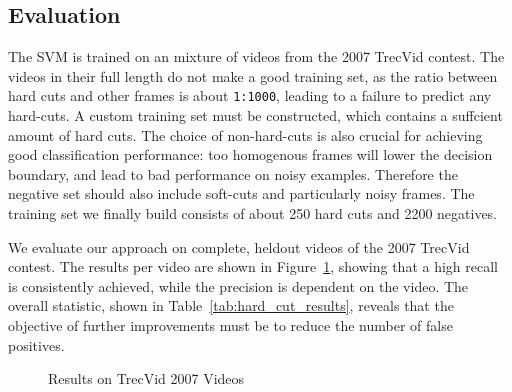 \FloatBarrier
\subsection{Evaluation}
\label{sec:hard_cut_evaluation}




The SVM is trained on an mixture of videos from the 2007 TrecVid contest.
The videos in their full length do not make a good training set, as the ratio between hard cuts and other frames is about \texttt{1:1000}, leading to a failure to predict any hard-cuts.
A custom training set must be constructed, which contains a suffcient amount of hard cuts.
The choice of non-hard-cuts is also crucial for achieving good classification performance: too homogenous frames will lower the decision boundary, and lead to bad performance on noisy examples.
Therefore the negative set should also include soft-cuts and particularly noisy frames.
The training set we finally build consists of about 250 hard cuts and 2200 negatives.


We evaluate our approach on complete, heldout videos of the 2007 TrecVid contest. The results per video are shown in Figure~\ref{fid:scatterplothceval}, showing that a high recall is consistently achieved, while the precision is dependent on the video. The overall statistic, shown in Table~\ref{tab:hard_cut_results},  reveals that the objective of further improvements must be to reduce the number of false positives.

\begin{figure}
\centering
{}
\caption{Results on TrecVid 2007 Videos}
\label{fid:scatterplothceval}
\end{figure}

